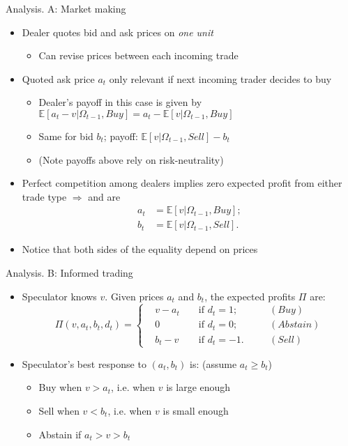 \documentclass[english,10pt
,aspectratio=169
]{beamer}
\begin{document}
\begin{frame}{Analysis. A: Market making}
\begin{itemize}[<+->]
	\item Dealer quotes bid and ask prices on \textit{one unit}
	\begin{itemize}
		\item Can revise prices between each incoming trade
	\end{itemize}
	\item Quoted ask price $a_t$ only relevant if next incoming trader decides to buy
	\begin{itemize}
		\item Dealer's payoff in this case is given by $\mathbb{E}[a_t-v|\Omega_{t-1}, Buy] = a_t - \mathbb{E}[v|\Omega_{t-1}, Buy]$
		\item Same for bid $b_t$; payoff: $\mathbb{E}[v|\Omega_{t-1}, Sell] - b_t$
		\item (Note payoffs above rely on risk-neutrality)
	\end{itemize}
	\item Perfect competition among dealers implies zero expected profit from either trade type $\Rightarrow$  and  are
	\begin{align*}
		a_t & = \mathbb{E}[v|\Omega_{t-1}, Buy]; \\
		b_t &= \mathbb{E}[v|\Omega_{t-1},  Sell].
	\end{align*}
	\item Notice that both sides of the equality depend on prices
\end{itemize}
\end{frame}


\begin{frame}{Analysis. B: Informed trading}
\begin{itemize}
	\item Speculator knows $v$. Given prices $a_t$ and $b_t$, the expected profits $\Pi$ are:
	\begin{equation*}
		\Pi(v,a_t,b_t,d_t)= \left\{
		\begin{aligned}
		&v - a_t  	&& \text{ if } d_t=1; \quad && (Buy)\\
		&0			&&\text{ if } d_t=0; \quad && (Abstain)\\
		&b_t - v 	&& \text{ if } d_t=-1. \quad && (Sell)
		\end{aligned}
		\right.
	\end{equation*}
	\pause
	\item Speculator's best response to $(a_t,b_t)$ is: (assume $a_t \geq b_t$)
	\begin{itemize}
		\item Buy when $v > a_t$, i.e. when $v$ is large enough
		\item Sell when $v<b_t$, i.e. when $v$ is small enough
		\item Abstain if $a_t > v > b_t$
	\end{itemize}
\end{itemize}
\end{frame}
\end{document}
